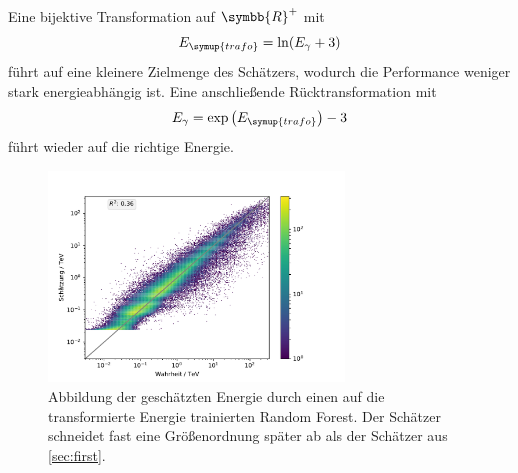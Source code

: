 Eine bijektive Transformation auf $\symbb{R}^+$ mit
\begin{equation}
  E_{\symup{trafo}}=\ln(E_\gamma +3)
  \label{eqn:trafo}
\end{equation}
führt auf eine kleinere Zielmenge des Schätzers, wodurch die Performance weniger stark energieabhängig ist.
Eine anschließende Rücktransformation mit
\begin{equation}
  E_\gamma = \exp \left(E_{\symup{trafo}}\right)-3
\end{equation}
führt wieder auf die richtige Energie.
\begin{figure}
  \includegraphics[width=0.7\textwidth]{Plots/trafo_encaps.pdf}
  \centering
  \caption{Abbildung der geschätzten Energie durch einen auf die transformierte Energie trainierten Random Forest. Der Schätzer schneidet fast eine Größenordnung
          später ab als der Schätzer aus \autoref{sec:first}.}
  \label{abb:Energie_trafo}
\end{figure}

